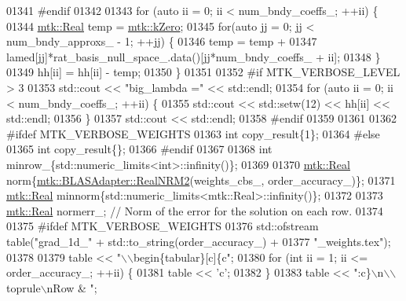 \begin{DoxyCode}
{{01341 \textcolor{preprocessor}{    #endif}
01342 
01343     \textcolor{keywordflow}{for} (\textcolor{keyword}{auto} ii = 0; ii < num\_bndy\_coeffs\_; ++ii) \{
01344       \hyperlink{group__c01-roots_gac080bbbf5cbb5502c9f00405f894857d}{mtk::Real} temp = \hyperlink{group__c01-roots_ga59a451a5fae30d59649bcda274fea271}{mtk::kZero};
01345       \textcolor{keywordflow}{for}(\textcolor{keyword}{auto} jj = 0; jj < num\_bndy\_approxs\_ - 1; ++jj) \{
01346         temp = temp +
01347           lamed[jj]*rat\_basis\_null\_space\_.data()[jj*num\_bndy\_coeffs\_ + ii];
01348       \}
01349       hh[ii] = hh[ii] - temp;
01350     \}
01351 
01352 \textcolor{preprocessor}{    #if MTK\_VERBOSE\_LEVEL > 3}
01353     std::cout << \textcolor{stringliteral}{"big\_lambda ="} << std::endl;
01354     \textcolor{keywordflow}{for} (\textcolor{keyword}{auto} ii = 0; ii < num\_bndy\_coeffs\_; ++ii) \{
01355       std::cout << std::setw(12) << hh[ii] << std::endl;
01356     \}
01357     std::cout << std::endl;
01358 \textcolor{preprocessor}{    #endif}
01359 
01361 
01362 \textcolor{preprocessor}{    #ifdef MTK\_VERBOSE\_WEIGHTS}
01363     \textcolor{keywordtype}{int} copy\_result\{1\};
01364 \textcolor{preprocessor}{    #else}
01365     \textcolor{keywordtype}{int} copy\_result\{\};
01366 \textcolor{preprocessor}{    #endif}
01367 
01368     \textcolor{keywordtype}{int} minrow\_\{std::numeric\_limits<int>::infinity()\};
01369 
01370     \hyperlink{group__c01-roots_gac080bbbf5cbb5502c9f00405f894857d}{mtk::Real} norm\{\hyperlink{classmtk_1_1BLASAdapter_ab92440888b730863244c5d9479c11aca}{mtk::BLASAdapter::RealNRM2}(weights\_cbs\_,
      order\_accuracy\_)\};
01371     \hyperlink{group__c01-roots_gac080bbbf5cbb5502c9f00405f894857d}{mtk::Real} minnorm\{std::numeric\_limits<mtk::Real>::infinity()\};
01372 
01373     \hyperlink{group__c01-roots_gac080bbbf5cbb5502c9f00405f894857d}{mtk::Real} normerr\_; \textcolor{comment}{// Norm of the error for the solution on each row.}
01374 
01375 \textcolor{preprocessor}{    #ifdef MTK\_VERBOSE\_WEIGHTS}
01376     std::ofstream table(\textcolor{stringliteral}{"grad\_1d\_"} + std::to\_string(order\_accuracy\_) +
01377       \textcolor{stringliteral}{"\_weights.tex"});
01378 
01379     table << \textcolor{stringliteral}{"\(\backslash\)\(\backslash\)begin\{tabular\}[c]\{c"};
01380     \textcolor{keywordflow}{for} (\textcolor{keywordtype}{int} ii = 1; ii <= order\_accuracy\_; ++ii) \{
01381       table << \textcolor{charliteral}{'c'};
01382     \}
01383     table << \textcolor{stringliteral}{":c\}\(\backslash\)n\(\backslash\)\(\backslash\)toprule\(\backslash\)nRow & "};
}}
\end{DoxyCode}
